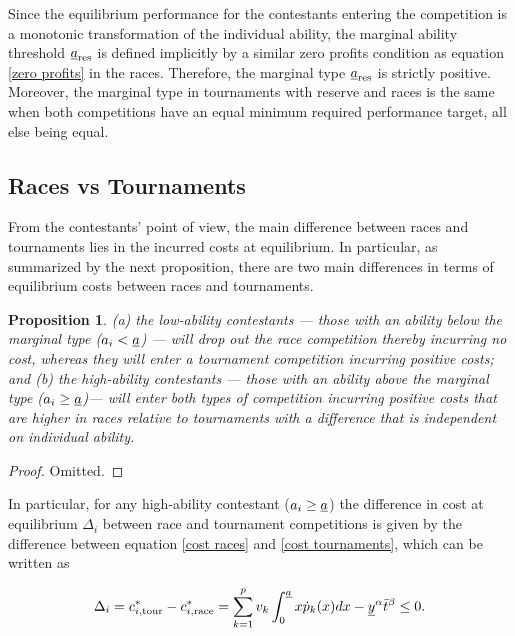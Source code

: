 \documentclass[10pt, titlepage]{article}
\newtheorem{proposition}{Proposition}
\newcommand\deadline{\bar{t}}
\newcommand\target{\underline{y}}
\newcommand\race{\text{race}}
\newcommand\tournament{\text{tour}}
\begin{document}
Since the equilibrium performance for the contestants entering the
competition is a monotonic transformation of the individual ability, the
marginal ability threshold \(\underline{a}_{\text{res}}\) is defined implicitly
by a similar zero profits condition as equation \eqref{zero profits} in
the races. Therefore, the marginal type \(\underline{a}_{\text{res}}\) is
strictly positive. Moreover, the marginal type in tournaments with
reserve and races is the same when both competitions have an equal
minimum required performance target, all else being equal.

\subsection{Races vs Tournaments}\label{races-vs-tournaments}

From the contestants' point of view, the main difference between races
and tournaments lies in the incurred costs at equilibrium. In
particular, as summarized by the next proposition, there are two main
differences in terms of equilibrium costs between races and tournaments.

\begin{proposition}
(a) the low-ability contestants --- those with an ability below the marginal type ($a_i<\underline{a}$) --- will drop out the race competition thereby incurring no cost, whereas they will enter a tournament competition incurring positive costs; and (b) the high-ability contestants --- those with an ability above the marginal type ($a_i\geq\underline{a}$)--- will enter both types of competition incurring positive costs that are higher in races relative to tournaments with a difference that is independent on individual ability. 
\end{proposition}

\begin{proof}
Omitted.
\end{proof}

In particular, for any high-ability contestant (\(a_i\geq\underline{a}\))
the difference in cost at equilibrium \(\Delta_i\) between race and
tournament competitions is given by the difference between equation
\eqref{cost races} and \eqref{cost tournaments}, which can be written as

\begin{equation}
    \Delta_i = c_{i,\tournament}^* - c_{i,\race}^* 
    = \sum_{k=1}^{p} v_k \int_0^{\marginal} x \dot p_k(x) d x - \target^\alpha \deadline^\beta \leq 0.
\end{equation}
\end{document}
